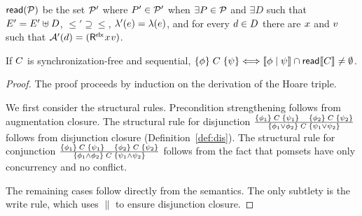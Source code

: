 

 ${\mathsf{read}}(\mathcal{P})$ be the set $\mathcal{P}'$ where $P'\in\mathcal{P}'$ when
$\exists P\in\mathcal{P}$ and  $\exists D$ such that $E'= E'\uplus D$,
${\le'} \supseteq{\le}$, $\lambda'(e) = \lambda(e)$, and for every
$d\in D$ there are $x$ and $v$ such that
$\labelingAct'(\bEv)=(\DR[\modeRLX]{\aLoc}{\aVal})$.

\begin{theorem}
  \label{thm:hoare}
  If $C$ is synchronization-free and sequential,
  $\{\phi\}\allowbreak\;C\;\allowbreak\{\psi\}\Longleftrightarrow\llbracket\phi\mid\psi\rrbracket\cap\mathsf{read}\llbracket C\rrbracket\neq\emptyset$.
\begin{proof}
  The proof proceeds by induction on the derivation of the Hoare triple.

  We first consider the structural rules.  Precondition strengthening follows
  from augmentation closure.   The structural rule for
  disjunction
  {\small\begin{math}
    \frac{\{\phi_1\}\allowbreak\;C\;\allowbreak\{\psi_1\}\quad  \{\phi_2\}\allowbreak\;C\;\allowbreak\{\psi_2\}}{ \{\phi_1 \lor \phi_2\}\allowbreak\;C\;\allowbreak\{\psi_1\lor \psi_2\}} 
  \end{math}}
follows from disjunction closure (Definition~\ref{def:dis}). The structural rule for conjunction
  {\small\begin{math}
    \frac{\{\phi_1\}\allowbreak\;C\;\allowbreak\{\psi_1\}\quad \{\phi_2\}\allowbreak\;C\;\allowbreak\{\psi_2\}}{ \{\phi_1 \land \phi_2\}\allowbreak\;C\;\allowbreak\{\psi_1\land \psi_2\}} 
  \end{math}}
  follows from the fact that pomsets have only concurrency and no conflict.  

  The remaining cases follow directly from the semantics.  The only subtlety
  is the write rule, which uses $\parallel$ to ensure disjunction closure.
\end{proof}
\end{theorem}

